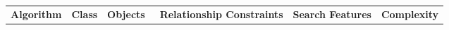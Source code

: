 \setlength\tabcolsep{0pt}
\small{
\begin{table*}[t]
    \begin{center}
        \begin{tabular}{|c|cc|cccc|ccc|c|} 

        

            \hline
            \multicolumn{1}{|c|}{\multirow{2}{*}{\textbf{Algorithm}}}& 
            \multicolumn{1}{|c}{\multirow{2}{*}{\textbf{Class}}} &
            \multicolumn{1}{c|}{\multirow{2}{*}{\textbf{Objects}~}} &
            \multicolumn{4}{|c|}{\multirow{2}{*}{\textbf{Relationship Constraints}}} &
            \multicolumn{3}{|c|}{\multirow{2}{*}{\textbf{Search Features}}} &
            \multicolumn{1}{|c|}{\multirow{2}{*}{\textbf{Complexity}}}\\
            &&&&&&&&&&\\
        



\end{tabular}
\end{center}
\end{table*}}
